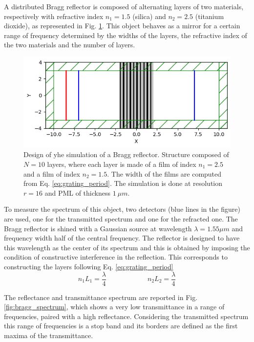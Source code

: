 A distributed Bragg reflector is composed of alternating layers of two materials, respectively with refractive index \(n_1 = 1.5\) (silica) and \(n_2 = 2.5\) (titanium dioxide), as represented in Fig. \ref{fig:bragg_design}. This object behaves as a mirror for a certain range of frequency determined by the widths of the layers, the refractive index of the two materials and the number of layers.

\begin{figure}[H]
    \centering
    \includegraphics[width=0.8\linewidth]{Figures/bragg_design.png}
    \caption{Design of yhe simulation of a Bragg reflector. Structure composed of \(N=10\) layers, where each layer is made of a film of index \(n_1 = 2.5\) and a film of index \(n_2=1.5\). The width of the films are computed from Eq. \ref{eq:grating_period}. The simulation is done at resolution \(r=16\) and PML of thickness \(1\ \mu m\).}
    \label{fig:bragg_design}
\end{figure}

To measure the spectrum of this object, two detectors (blue lines in the figure) are used, one for the transmitted spectrum and one for the refracted one. The Bragg reflector is shined with a Gaussian source at wavelength \(\lambda = 1.55 \mu m\) and frequency width half of the central frequency. The reflector is designed to have this wavelength as the center of its spectrum and this is obtained by imposing the condition of constructive interference in the reflection. This corresponds to constructing the layers following Eq. \ref{eq:grating_period}  
\begin{equation}\label{eq:grating_period}
    n_1 L_1 = \frac{\lambda}{4} \qquad\qquad\qquad n_2 L_2 = \frac{\lambda}{4}
\end{equation}

The reflectance and transmittance spectrum are reported in Fig. \ref{fig:bragg_spectrum}, which shows a very low transmittance in a range of frequencies, paired with a high reflectance. Considering the transmitted spectrum this range of frequencies is a stop band and its borders are defined as the first maxima of the transmittance.

